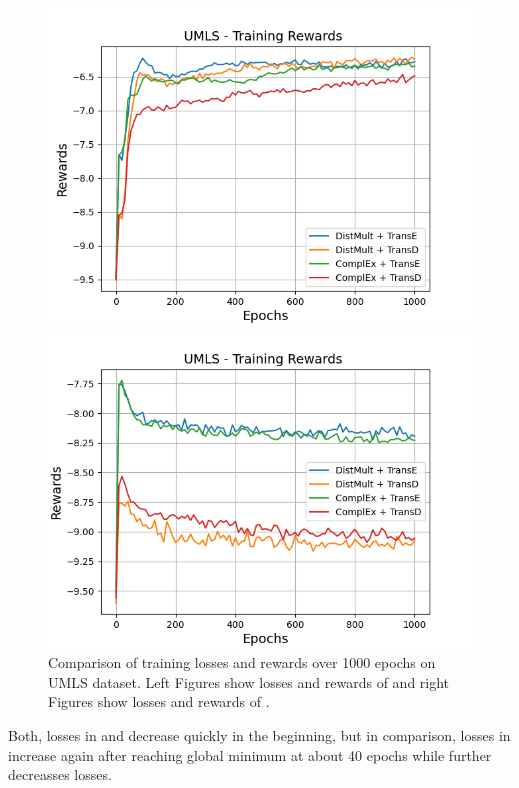 \begin{figure}[H]
\begin{minipage}{.5\textwidth}
      \includegraphics[width=0.9\linewidth]{figures/results/gan_train/not_pretrained/random/umls/epochs1000/random_umls_rew.png}
    \end{minipage}%
    \begin{minipage}{.5\textwidth}
      \centering
      \includegraphics[width=0.9\linewidth]{figures/results/gan_train/not_pretrained/uncertainty/max_distribution/entropy/umls/1k_epochs/uncertainty_umls_rew.png}
    \end{minipage}%
    \caption{Comparison of training losses and rewards over 1000 epochs on \textsc{UMLS} dataset.
    Left Figures show losses and rewards of \origsampling and right Figures show losses and rewards of \ussoftmax.}
    \label{fig:advtrain_umls_losses_rewards}
\end{figure}
Both, losses in \origsampling and \ussoftmax decrease quickly in the beginning, but in comparison, losses in \origsampling increase again after reaching global minimum at about 40 epochs while \ussoftmax further decreasses losses.
